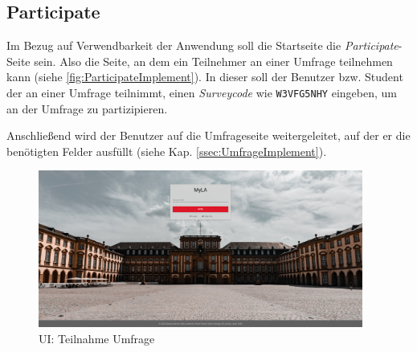 
\subsection{Participate}
Im Bezug auf Verwendbarkeit der Anwendung soll die Startseite die \emph{Participate}-Seite sein.
Also die Seite, an dem ein Teilnehmer an einer Umfrage teilnehmen kann (siehe \vref{fig:ParticipateImplement}). \newline
In dieser soll der Benutzer bzw. Student der an einer Umfrage teilnimmt, einen \emph{Surveycode} wie \zb \texttt{W3VFG5NHY} eingeben, um an der Umfrage zu partizipieren.

Anschließend wird der Benutzer auf die Umfrageseite weitergeleitet, auf der er die benötigten Felder ausfüllt (siehe Kap. \vref{ssec:UmfrageImplement}).

\begin{figure}[h]
	\centering
	\includegraphics[width=0.95\textwidth, keepaspectratio]{img/client/Participate.png}
	\captionsetup{justification=centering, format=plain}
	\caption[\acl{UI}: Teilnahme Umfrage]{\acl{UI}: Teilnahme Umfrage \\ \quelleScreenshot}
	\label{fig:ParticipateImplement}
\end{figure}
